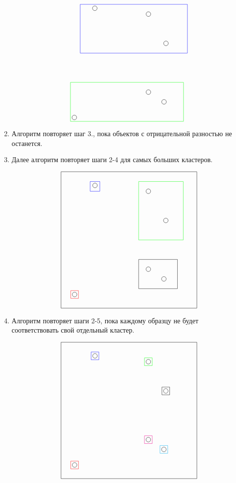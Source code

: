 \documentclass[12pt, a4paper]{article}
\begin{document}
\begin{enumerate}
\[\begin{tikzpicture}
\begin{scope}[yshift=-9cm]
        \draw (-2.8, -2.8) circle (0.12);
        \draw (-1.75, 2.8) circle (0.12);
        \draw (1, 2.5) circle (0.12);
        \draw (1.9, 1) circle (0.12);
        \draw (1, -1.5) circle (0.12);
        \draw (1.8, -2) circle (0.12);

        
        \draw[blue] (-2.5, 0.5) rectangle (3, 3);
        \draw[green] (-3, -3) rectangle (2.8, -1);
    \end{scope}
\end{tikzpicture}
\]

\item Алгоритм повторяет шаг 3., пока объектов с отрицательной разностью не останется.

\item Далее алгоритм повторяет шаги 2-4 для самых больших кластеров. 

\[
\begin{tikzpicture}
        \begin{scope}[yshift=-9cm]
        \draw (-3.5, 3.5) -- (3.5, 3.5);
        \draw (-3.5, -3.5) -- (3.5, -3.5);
        \draw (-3.5, -3.5) -- (-3.5, 3.5);
        \draw (3.5, 3.5) -- (3.5, -3.5);

        \draw (-2.8, -2.8) circle (0.12);
        \draw (-1.75, 2.8) circle (0.12);
        \draw (1, 2.5) circle (0.12);
        \draw (1.9, 1) circle (0.12);
        \draw (1, -1.5) circle (0.12);
        \draw (1.8, -2) circle (0.12);

        
        \draw[blue] (-2, 3) rectangle (-1.5, 2.5);
        \draw[green] (0.5, 3) rectangle (2.8, 0);
        \draw[black] (0.5, -1) rectangle (2.5, -2.5);
        \draw[red] (-3, -3) rectangle (-2.6, -2.6);
    \end{scope}
\end{tikzpicture}
\]


\item Алгоритм повторяет шаги 2-5,  пока каждому образцу не будет соответствовать свой отдельный кластер.

\[
\begin{tikzpicture}
        \begin{scope}[yshift=-9cm]
        \draw (-3.5, 3.5) -- (3.5, 3.5);
        \draw (-3.5, -3.5) -- (3.5, -3.5);
        \draw (-3.5, -3.5) -- (-3.5, 3.5);
        \draw (3.5, 3.5) -- (3.5, -3.5);

        \draw (-2.8, -2.8) circle (0.12);
        \draw (-1.75, 2.8) circle (0.12);
        \draw (1, 2.5) circle (0.12);
        \draw (1.9, 1) circle (0.12);
        \draw (1, -1.5) circle (0.12);
        \draw (1.8, -2) circle (0.12);

        
        \draw[blue] (-1.95, 3) rectangle (-1.55, 2.6);
        \draw[red] (-3, -3) rectangle (-2.6, -2.6);
        \draw[green] (0.8, 2.7) rectangle (1.2, 2.3);
        \draw[black] (1.7, 1.2) rectangle (2.1, 0.8);
        \draw[magenta] (0.8, -1.3) rectangle (1.2, -1.7);
        \draw[cyan] (1.6, -1.8) rectangle (2, -2.2);
    \end{scope}
\end{tikzpicture}
\]

\end{enumerate}
\end{document}
